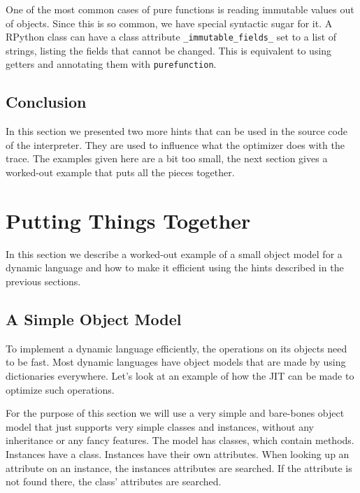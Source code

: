 \documentclass{sig-alternate}
\begin{document}
One of the most common cases of pure functions is reading immutable
values out of objects. Since this is so common, we have special syntactic sugar
for it. A RPython class can have a class attribute \texttt{\_immutable\_fields\_} set to
a list of strings, listing the fields that cannot be changed. This is equivalent
to using getters and annotating them with \texttt{purefunction}.



\subsection{Conclusion}

In this section we presented two more hints that can be used in the source code
of the interpreter. They are used to influence what the optimizer does with the
trace. The examples given here are a bit too small, the next
section gives a worked-out example that puts all the pieces together.


\section{Putting Things Together}

In this section we describe a worked-out example of
a small object model for a dynamic language and how to make it efficient using
the hints described in the previous sections.



\subsection{A Simple Object Model}

To implement a dynamic language efficiently, the operations on its objects need
to be fast. Most dynamic languages have object models that are made by using
dictionaries everywhere. Let's look at an example of how the JIT can be made to
optimize such operations.

For the purpose of this section we will use a very simple and bare-bones
object model that just supports very simple classes and instances, without any
inheritance or any fancy features. The model has classes, which contain methods.
Instances have a class. Instances have their own attributes. When looking up an
attribute on an instance, the instances attributes are searched. If the
attribute is not found there, the class' attributes are searched.
\end{document}
